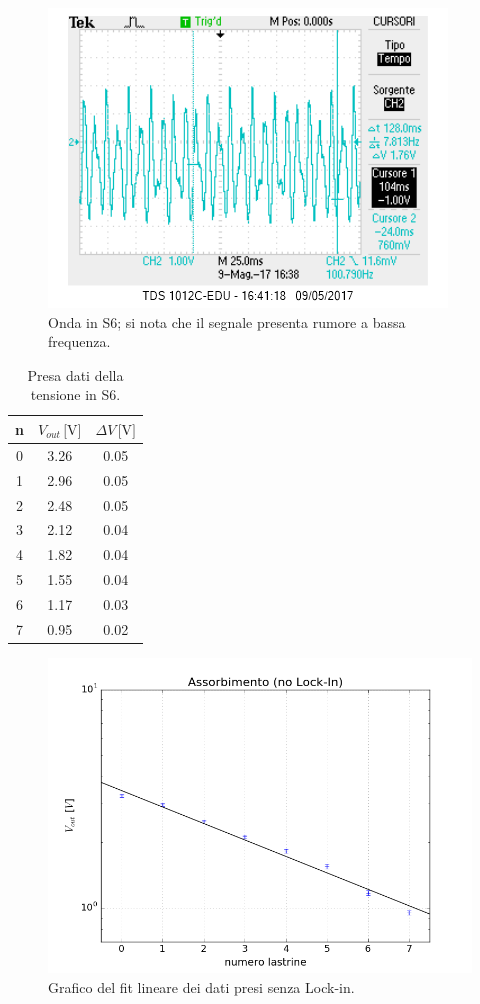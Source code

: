 \documentclass[10pt,a4paper]{article}
\begin{document}
\begin{figure}[!htb]
  \centering
  \includegraphics[scale=0.75]{S6.png}
\caption{Onda in S6; si nota che il segnale presenta rumore a bassa frequenza.\label{osc:S6}}
\end{figure}

\begin{table}[!htb]
\centering
\begin{tabular}{|c|c|c|}
\hline
n	&	$V_{out}\,\mbox{[V]}$	&	$\Delta V\,\mbox{[V]}$\\
\hline
0 &  3.26  &  0.05\\
\hline
1  & 2.96  &  0.05\\
\hline
2 &  2.48  &  0.05\\
\hline
3  & 2.12   & 0.04\\
\hline
4   &1.82   & 0.04\\
\hline
5   &1.55    &0.04\\
\hline
6   &1.17   & 0.03\\
\hline
7   &0.95    & 0.02\\
\hline
\end{tabular}
\caption{Presa dati della tensione in S6.\label{tab:abs1}}
\end{table}

\begin{figure}[!htb]
  \centering
\includegraphics[scale=0.7]{plot-lin1.png}
\caption{Grafico del fit lineare dei dati presi senza Lock-in.\label{plot1}}
\end{figure}
\end{document}
